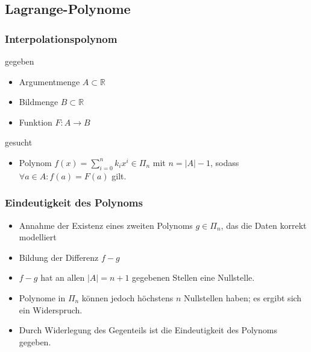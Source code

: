 \documentclass[table]{beamer}
\begin{document}
\subsection{Lagrange-Polynome}
	\begin{frame}
	\frametitle{Interpolationspolynom}
		\begin{block}{gegeben}
			\begin{itemize}
				\item Argumentmenge $A \subset \mathbb{R}$
				\item Bildmenge $B \subset \mathbb{R}$
				\item Funktion $F\colon A \to B$
			\end{itemize}
		\end{block}
		\begin{block}{gesucht}
			\begin{itemize}
				\item Polynom $f(x) = \sum_{i=0}^n k_ix^i \in \Pi_n$ mit $n=\vert A\vert -1$, sodass $\forall a \in A \colon f(a) = F(a)$ gilt.
			\end{itemize}
		\end{block}
	\end{frame}
	\begin{frame}
	\frametitle{Eindeutigkeit des Polynoms}
		\begin{itemize}[<+->]
			\item Annahme der Existenz eines zweiten Polynoms $g \in \Pi_n$, das die Daten korrekt modelliert
			\item Bildung der Differenz $f-g$
			\item $f-g$ hat an allen $\vert A\vert =n+1$ gegebenen Stellen eine Nullstelle.
			\item Polynome in $\Pi_n$ können jedoch höchstens $n$ Nullstellen haben; es ergibt sich ein Widerspruch.
			\item Durch Widerlegung des Gegenteils ist die Eindeutigkeit des Polynoms gegeben.
		\end{itemize}
	\end{frame}
\end{document}
